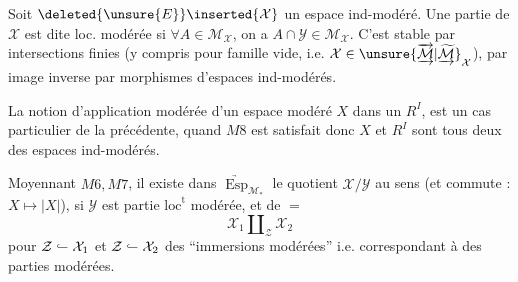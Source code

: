Soit $\deleted{\unsure{E}}\inserted{\mathcal X}$ un espace ind-modéré. Une partie  de $\mathcal X$ est dite loc. modérée si $\forall A\in\mathcal M_{\mathcal X}$, on a $A\cap\mathcal Y\in\mathcal M_{\mathcal X}$. C'est stable par intersections finies (y compris pour famille vide, i.e. $\mathcal X\in\unsure{\underrightarrow{\overrightarrow{\mathcal M}}|\underrightarrow{\widetilde{\mathcal M}}}_{\mathcal X}$), par image inverse par morphismes  d'espaces ind-modérés.

La notion d'application modérée d'un espace modéré $X$ dans un $R^I$, est un cas particulier de la précédente, quand $M8$ est satisfait donc $X$ et $R^I$ sont tous deux des espaces ind-modérés.

Moyennant $M6,M7$, il existe  dans $\underrightarrow{\operatorname{Esp}}_{\mathcal M_*}$ le quotient $\mathcal X/\mathcal Y$ au sens (et commute : $X\mapsto|X|$), si $\mathcal Y$ est partie $\mathrm{loc}^{\mathrm t}$ modérée, et de $=$
\[
 \mathcal X_1\amalg_{\mathcal Z}\mathcal X_2
\]
pour $\mathcal Z\lhook\joinrel\relbar\mathcal X_1$ et $\mathcal Z\lhook\joinrel\relbar\mathcal X_2$ des ``immersions modérées'' i.e. correspondant à des parties  modérées.
